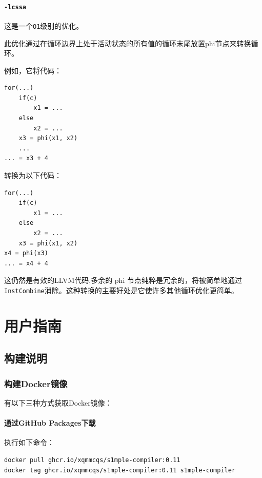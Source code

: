 \documentclass[lang=cn,11pt,a4paper,cite=authornum]{paper}
\begin{document}
\paragraph{\texttt{-lcssa}}

这是一个\texttt{O1}级别的优化。

此优化通过在循环边界上处于活动状态的所有值的循环末尾放置phi节点来转换循环。

例如，它将代码：

\begin{code}
\begin{verbatim}
for(...)
    if(c)
        x1 = ...
    else
        x2 = ...
    x3 = phi(x1, x2)
    ...
... = x3 + 4
\end{verbatim}
\end{code}

转换为以下代码：

\begin{code}
\begin{verbatim}
for(...)
    if(c)
        x1 = ...
    else
        x2 = ...
    x3 = phi(x1, x2)
x4 = phi(x3)
... = x4 + 4
\end{verbatim}
\end{code}

这仍然是有效的LLVM代码,多余的 phi 节点纯粹是冗余的，将被简单地通过\texttt{InstCombine}消除。这种转换的主要好处是它使许多其他循环优化更简单。

\section{用户指南}

\subsection{构建说明}

\subsubsection{构建Docker镜像}

有以下三种方式获取Docker镜像：

\paragraph{通过GitHub Packages下载} 执行如下命令：

\begin{code}
\begin{verbatim}
docker pull ghcr.io/xqmmcqs/s1mple-compiler:0.11
docker tag ghcr.io/xqmmcqs/s1mple-compiler:0.11 s1mple-compiler
\end{verbatim}
\end{code}
\end{document}
